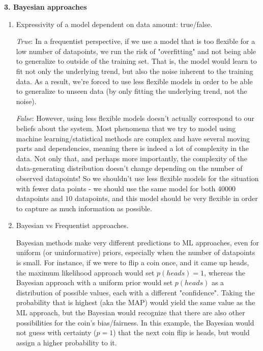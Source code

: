 \documentclass[11pt]{article}
\begin{document}
\textbf{3. Bayesian approaches}

\begin{enumerate}[label=\textbf{\alph*.}]

    \item Expressivity of a model dependent on data amount: true/false.

        \textit{True}: In a frequentist perspective, if we use a model that is too flexible for a low number of datapoints, we run the risk of "overfitting" and not being able to generalize to outside of the training set. That is, the model would learn to fit not only the underlying trend, but also the noise inherent to the training data. As a result, we're forced to use less flexible models in order to be able to generalize to unseen data (by only fitting the underlying trend, not the noise).

        \textit{False}: However, using less flexible models doesn't actually correspond to our beliefs about the system. Most phenomena that we try to model using machine learning/statistical methods are complex and have several moving parts and dependencies, meaning there is indeed a lot of complexity in the data. Not only that, and perhaps more importantly, the complexity of the data-generating distribution doesn't change depending on the number of observed datapoints! So we shouldn't use less flexible models for the situation with fewer data points - we should use the same model for both $40000$ datapoints and $10$ datapoints, and this model should be very flexible in order to capture as much information as possible.

    \item Bayesian vs Frequentist approaches.

        Bayesian methods make very different predictions to ML approaches, even for uniform (or uninformative) priors, especially when the number of datapoints is small. For instance, if we were to flip a coin once, and it came up heads, the maximum likelihood approach would set $p(heads)=1$, whereas the Bayesian approach with a uniform prior would set $p(heads)$ as a distribution of possible values, each with a different "confidence". Taking the probability that is highest (aka the MAP) would yield the same value as the ML approach, but the Bayesian would recognize that there are also other possibilities for the coin's bias/fairness. In this example, the Bayesian would not guess with certainty ($p=1$) that the next coin flip is heads, but would assign a higher probability to it.


\end{enumerate}
\end{document}
